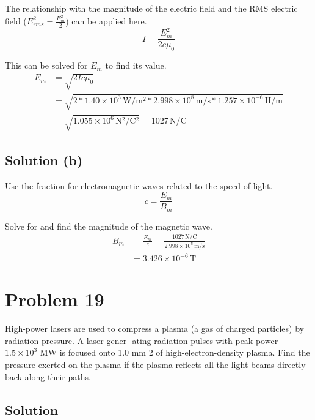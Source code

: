 \documentclass[12pt]{article}
\newcommand{\E}[1]{\times 10^{#1}}
\begin{document}
            The relationship with the magnitude of the electric field and the RMS electric field ($E_{rms}^2 = \frac{E_m^2}{2}$) can be applied here.
            \begin{equation}
                I = \frac{E_m^2}{2c\mu_0}
            \end{equation}

            This can be solved for $E_m$ to find its value.
            \begin{align}
                E_m &=  \sqrt{2Ic\mu_0}\\
                    &=  \sqrt{2 * 1.40\E{3}\,\unit{\watt/\meter^2} * 2.998\E{8}\,\unit{\meter/\second} * 1.257\E{-6}\,\unit{\henry/\meter}}\\
                    &=  \sqrt{1.055\E{6}\,\unit{\newton^2/\coulomb^2}}
                    =   \boxed{1027\,\unit{\newton/\coulomb}}
            \end{align}

        \subsection{Solution (b)}
            Use the fraction for electromagnetic waves related to the speed of light.
            \begin{equation}
                c   =   \frac{E_m}{B_m}
            \end{equation}

            Solve for and find the magnitude of the magnetic wave.
            \begin{align}
                B_m &=  \frac{E_m}{c}
                    =   \frac{1027\,\unit{\newton/\coulomb}}{2.998\E{8}\,\unit{\meter/\second}}\\
                    &=  \boxed{3.426\E{-6}\,\unit{\tesla}}
            \end{align}

    \pagebreak
    \section{Problem 19}
        High-power lasers are used to compress a plasma
(a gas of charged particles) by radiation pressure. A laser gener-
ating radiation pulses with peak power $1.5\E{3}$ MW is focused
onto 1.0 mm 2 of high-electron-density plasma. Find the pressure
exerted on the plasma if the plasma reflects all the light beams
directly back along their paths.

        \subsection{Solution}
\end{document}
